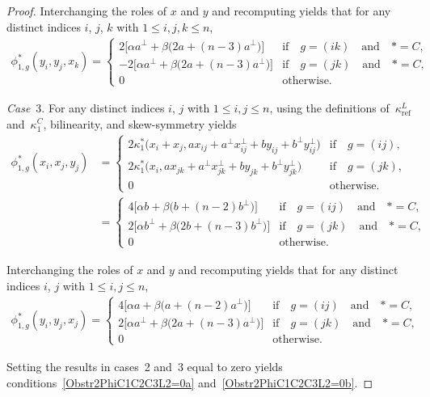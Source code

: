 \documentclass[10pt,a4paper]{amsart}
\numberwithin{equation}{section}
\DeclareMathOperator{\refl}{ref}
\begin{document}
\begin{proof}
Interchanging the roles of $x$ and $y$ and recomputing yields that for any
distinct indices $i$, $j$, $k$ with $1 \leq i, j, k \leq n$,
\begin{gather*}
\phi^*_{1,g}(y_i,y_j,x_k)=
\begin{cases}
2\big[\alpha a^\perp + \beta\big(2a+(n-3)a^\perp\big)\big] & \text{if}\quad g=(ik) \quad\text{and}\quad *=C, \\
	 -2\big[\alpha a^\perp + \beta\big(2a+(n-3)a^\perp\big)\big] & \text{if}\quad g=(jk) \quad\text{and}\quad *=C, \\
 0 & \text{otherwise}.
 \end{cases}
\end{gather*}

\textit{Case}~3.
For any distinct indices $i$, $j$ with $1 \leq i, j \leq n$,
using the definitions of~$\kappa^L_{\refl}$ and~$\kappa^C_1$, bilinearity,
and skew-symmetry yields
\begin{align*}
\phi^*_{1,g}(x_i,x_j,y_j)%
&=\begin{cases}
2\kappa^*_1\big(x_i+x_j,ax_{ij}+a^\perp x_{ij}^\perp + by_{ij} + b^\perp y_{ij}^\perp\big) &\text{if}\quad g=(ij), \\
2\kappa^*_1\big(x_i,ax_{jk}+a^\perp x_{jk}^\perp + b y_{jk} + b^\perp y_{jk}^\perp\big) &\text{if}\quad g=(jk), \\
 0 & \text{otherwise}.
\end{cases}
\\
&=\begin{cases}
4\big[\alpha b + \beta\big(b+(n-2)b^\perp\big)\big] & \text{if}\quad g=(ij) \quad\text{and}\quad *=C, \\
2\big[\alpha b^\perp + \beta\big(2b+(n-3)b^\perp\big)\big] & \text{if}\quad g=(jk) \quad\text{and}\quad *=C,
\\
0 & \text{otherwise}.
\end{cases}
\end{align*}

Interchanging the roles of $x$ and $y$ and recomputing yields that for any
distinct indices $i$, $j$ with $1 \leq i, j \leq n$,
\begin{gather*}
\phi^*_{1,g}(y_i,y_j,x_j)=
\begin{cases}
4\big[\alpha a + \beta\big(a+(n-2)a^\perp\big)\big] & \text{if}\quad g=(ij) \quad\text{and}\quad *=C, \\
2\big[\alpha a^\perp + \beta\big(2a+(n-3)a^\perp\big)\big] & \text{if}\quad g=(jk) \quad\text{and}\quad *=C, \\
 0 & \text{otherwise}.
 \end{cases}
\end{gather*}

Setting the results in cases~2 and~3 equal to zero yields
conditions~\eqref{Obstr2PhiC1C2C3L2=0a} and~\eqref{Obstr2PhiC1C2C3L2=0b}.
\end{proof}
\end{document}
